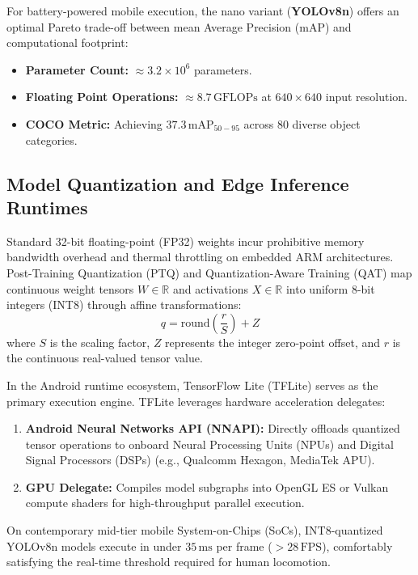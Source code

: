 \documentclass[10pt,twocolumn]{article}
\begin{document}
For battery-powered mobile execution, the nano variant (\textbf{YOLOv8n}) offers an optimal Pareto trade-off between mean Average Precision (mAP) and computational footprint:
\begin{itemize}[leftmargin=*]
    \item \textbf{Parameter Count:} $\approx 3.2 \times 10^6$ parameters.
    \item \textbf{Floating Point Operations:} $\approx 8.7\,\text{GFLOPs}$ at $640 \times 640$ input resolution.
    \item \textbf{COCO Metric:} Achieving $37.3\,\text{mAP}_{50-95}$ across 80 diverse object categories.
\end{itemize}

\subsection{Model Quantization and Edge Inference Runtimes}
Standard 32-bit floating-point (FP32) weights incur prohibitive memory bandwidth overhead and thermal throttling on embedded ARM architectures. Post-Training Quantization (PTQ) and Quantization-Aware Training (QAT) map continuous weight tensors $W \in \mathbb{R}$ and activations $X \in \mathbb{R}$ into uniform 8-bit integers (INT8) through affine transformations:
\begin{equation}
    q = \text{round}\left( \frac{r}{S} \right) + Z
\end{equation}
where $S$ is the scaling factor, $Z$ represents the integer zero-point offset, and $r$ is the continuous real-valued tensor value.

In the Android runtime ecosystem, TensorFlow Lite (TFLite) serves as the primary execution engine. TFLite leverages hardware acceleration delegates:
\begin{enumerate}[leftmargin=*]
    \item \textbf{Android Neural Networks API (NNAPI):} Directly offloads quantized tensor operations to onboard Neural Processing Units (NPUs) and Digital Signal Processors (DSPs) (e.g., Qualcomm Hexagon, MediaTek APU).
    \item \textbf{GPU Delegate:} Compiles model subgraphs into OpenGL ES or Vulkan compute shaders for high-throughput parallel execution.
\end{enumerate}
On contemporary mid-tier mobile System-on-Chips (SoCs), INT8-quantized YOLOv8n models execute in under $35\,\text{ms}$ per frame ($>28\,\text{FPS}$), comfortably satisfying the real-time threshold required for human locomotion.
\end{document}
